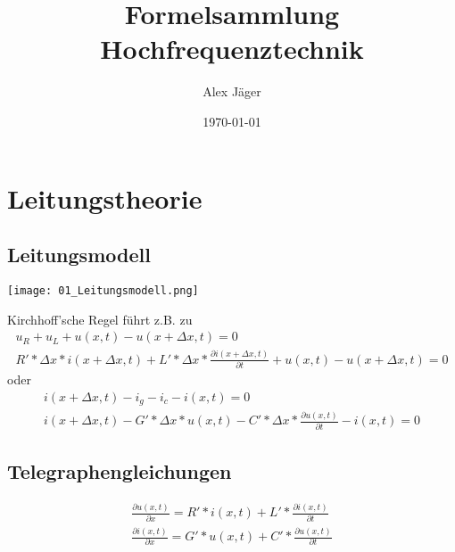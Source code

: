 \documentclass[11pt]{scrartcl}
\author{Alex Jäger}
\title{Formelsammlung Hochfrequenztechnik}
\date{\today}
\begin{document}
\maketitle
\newpage
\section{Leitungstheorie}
\subsection{Leitungsmodell}
\begin{center}
	\texttt{[image: 01\_Leitungsmodell.png]}
\end{center}
Kirchhoff'sche Regel führt z.B. zu
\begin{gather*}
	u_R+u_L+u(x,t)-u(x+\Delta x,t)=0 \\	
	R'*\Delta x*i(x+\Delta x,t)+L'*\Delta x*\frac{\partial i(x+\Delta x,t)}{\partial t}+u(x,t)-u(x+\Delta x,t)=0
\end{gather*}
oder
\begin{gather*}
	i(x+\Delta x,t)-i_g-i_c-i(x,t)=0 \\
	i(x+\Delta x,t)-G'*\Delta x*u(x,t)-C'*\Delta x*\frac{\partial u(x,t)}{\partial t}-i(x,t)=0
\end{gather*}

\subsection{Telegraphengleichungen}
\begin{eqnarray}
	\frac{\partial u(x,t)}{\partial x}=R'*i(x,t)+L'*\frac{\partial i(x,t)}{\partial t}\\
	\frac{\partial i(x,t)}{\partial x}=G'*u(x,t)+C'*\frac{\partial u(x,t)}{\partial t}
\end{eqnarray}


	

 
\end{document}
